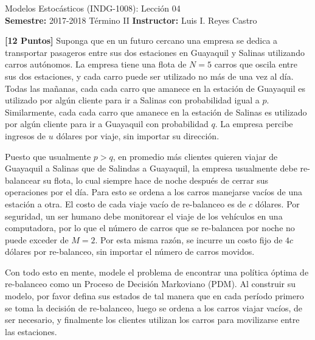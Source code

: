 \documentclass[ a4paper, twoside, 11pt]{article}
\newcommand{\numero}{04}
\begin{document}
\allowdisplaybreaks



\begin{center}
\Large Modelos Estoc\'asticos (INDG-1008): Lecci\'on \numero \\[2ex]
\small \textbf{Semestre:} 2017-2018 T\'ermino II \qquad
\textbf{Instructor:} Luis I. Reyes Castro
\end{center}
\fullskip

\begin{problem}
\textbf{[12 Puntos]} Suponga que en un futuro cercano una empresa se dedica a transportar pasageros entre sus dos estaciones en Guayaquil y Salinas utilizando carros aut\'onomos. \linebreak La empresa tiene una flota de $N = 5$ carros que oscila entre sus dos estaciones, y cada carro puede ser utilizado no m\'as de una vez al d\'ia. Todas las ma\~nanas, cada cada carro que amanece en la estaci\'on de Guayaquil es utilizado por alg\'un cliente para ir a Salinas con probabilidad igual a $p$. Similarmente, cada cada carro que amanece en la estaci\'on de Salinas es utilizado por alg\'un cliente para ir a Guayaquil con probabilidad $q$. La empresa percibe ingresos de $u$ d\'olares por viaje, sin importar su direcci\'on. 

Puesto que usualmente $p > q$, \ie en promedio m\'as clientes quieren viajar de Guayaquil a Salinas que de Salindas a Guayaquil, la empresa usualmente debe re-balancear su flota, lo cual siempre hace de noche despu\'es de cerrar sus operaciones por el d\'ia. Para esto se ordena a los carros manejarse vac\'ios de una estaci\'on a otra. El costo de cada viaje vac\'io de re-balanceo es de $c$ d\'olares. Por seguridad, un ser humano debe monitorear el viaje de los veh\'iculos en una computadora, por lo que el n\'umero de carros que se re-balancea por noche no puede exceder de $M = 2$. Por esta misma raz\'on, se incurre un costo fijo de $4c$ d\'olares por re-balanceo, sin importar el n\'umero de carros movidos. 

Con todo esto en mente, modele el problema de encontrar una pol\'itica \'optima de re-balanceo como un Proceso de Decisi\'on Markoviano (PDM). Al construir su modelo, por favor defina sus estados de tal manera que en cada per\'iodo primero se toma la decisi\'on de re-balanceo, luego se ordena a los carros viajar vac\'ios, de ser necesario, y finalmente los clientes utilizan los carros para movilizarse entre las estaciones. 


\end{problem}
\end{document}
